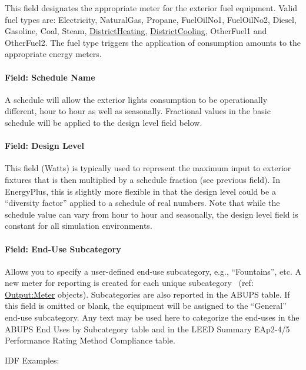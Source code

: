 This field designates the appropriate meter for the exterior fuel equipment. Valid fuel types are: Electricity, NaturalGas, Propane, FuelOilNo1, FuelOilNo2, Diesel, Gasoline, Coal, Steam, \hyperref[districtheating]{DistrictHeating}, \hyperref[districtcooling]{DistrictCooling}, OtherFuel1 and OtherFuel2. The fuel type triggers the application of consumption amounts to the appropriate energy meters.

\paragraph{Field: Schedule Name}\label{field-schedule-name-1-000}

A schedule will allow the exterior lights consumption to be operationally different, hour to hour as well as seasonally. Fractional values in the basic schedule will be applied to the design level field below.

\paragraph{Field: Design Level}\label{field-design-level-1}

This field (Watts) is typically used to represent the maximum input to exterior fixtures that is then multiplied by a schedule fraction (see previous field). In EnergyPlus, this is slightly more flexible in that the design level could be a ``diversity factor'' applied to a schedule of real numbers. Note that while the schedule value can vary from hour to hour and seasonally, the design level field is constant for all simulation environments.

\paragraph{Field: End-Use Subcategory}\label{field-end-use-subcategory-1}

Allows you to specify a user-defined end-use subcategory, e.g., ``Fountains'', etc. A new meter for reporting is created for each unique subcategory~ (ref: \hyperref[outputmeter-and-outputmetermeterfileonly]{Output:Meter} objects). Subcategories are also reported in the ABUPS table. If this field is omitted or blank, the equipment will be assigned to the ``General'' end-use subcategory. Any text may be used here to categorize the end-uses in the ABUPS End Uses by Subcategory table and in the LEED Summary EAp2-4/5 Performance Rating Method Compliance table.

IDF Examples:

